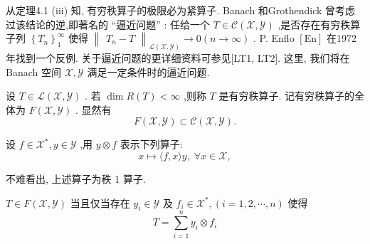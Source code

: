 \documentclass[lang=cn,newtx,10pt,scheme=chinese,thmcnt=chapter]{elegantbook}
\begin{document}
从定理4.1 (iii) 知, 有穷秩算子的极限必为紧算子. Banach 和Grothendick 曾考虑过该结论的逆,即著名的 “逼近问题” : 任给一个 \(T \in  \mathcal{C}\left( {\mathcal{X},\mathcal{Y}}\right)\) ,是否存在有穷秩算子列 \({\left\{  {T}_{n}\right\}  }_{1}^{\infty }\) 使得 \({\begin{Vmatrix}{T}_{n} - T\end{Vmatrix}}_{\mathcal{L}\left( {\mathcal{X},\mathcal{Y}}\right) } \rightarrow  0\left( {n \rightarrow  \infty }\right)\) . P. Enflo \(\left\lbrack  \mathrm{{En}}\right\rbrack\) 在1972年找到一个反例. 关于逼近问题的更详细资料可参见[LT1, LT2]. 这里, 我们将在Banach 空间 \(\mathcal{X},\mathcal{Y}\) 满足一定条件时的逼近问题.
\begin{definition}
    设 \(T \in  \mathcal{L}\left( {\mathcal{X},\mathcal{Y}}\right)\) . 若 \(\dim R\left( T\right)  < \infty\) ,则称 \(T\) 是有穷秩算子. 记有穷秩算子的全体为 \(F\left( {\mathcal{X},\mathcal{Y}}\right)\) . 显然有
\begin{equation*}
F\left( {\mathcal{X},\mathcal{Y}}\right)  \subset  \mathcal{C}\left( {\mathcal{X},\mathcal{Y}}\right) .
\end{equation*}
\end{definition}
\begin{definition}
    设 \(f \in  {\mathcal{X}}^{ * },y \in  \mathcal{Y}\) ,用 \(y \otimes  f\) 表示下列算子:
\begin{equation*}
x \mapsto  \langle f,x\rangle y,\;\forall x \in  \mathcal{X},
\end{equation*}

不难看出, 上述算子为秩 1 算子.
\end{definition}
\begin{theorem}
     \(T \in  F\left( {\mathcal{X},\mathcal{Y}}\right)\) 当且仅当存在 \({y}_{i} \in  \mathcal{Y}\) 及 \({f}_{i} \in  {\mathcal{X}}^{ * },\left( {i = 1,2,\cdots ,n}\right)\) 使得
\begin{equation*}
T = \mathop{\sum }\limits_{{i = 1}}^{n}{y}_{i} \otimes  {f}_{i}
\end{equation*}
\end{theorem}
\end{document}
